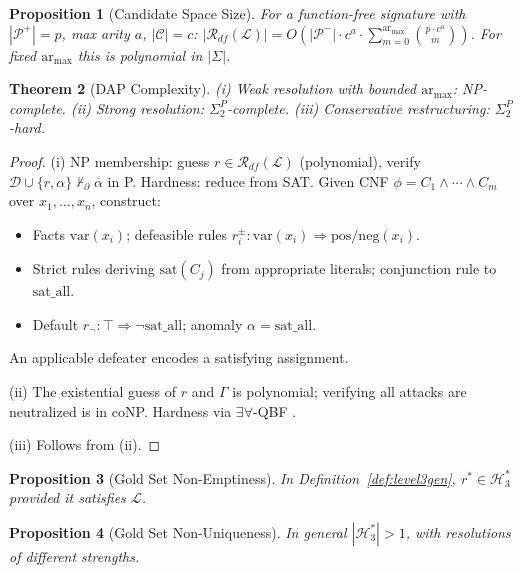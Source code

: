 \documentclass{article}
\newtheorem{theorem}{Theorem}[section]
\newtheorem{proposition}[theorem]{Proposition}
\theoremstyle{definition}
\newcommand{\D}{\mathcal{D}}
\newcommand{\Rgold}{\mathcal{H}^{*}_3}
\newcommand{\La}{\mathcal{L}}
\newcommand{\Rdfspace}{\mathcal{R}_{df}}
\newcommand{\pPartial}{\vdash_{\partial}}
\newcommand{\defto}{\Rightarrow}
\newcommand{\comp}[1]{\overline{#1}}
\begin{document}
\begin{proposition}[Candidate Space Size]\label{prop:candsize}
For a function-free signature with $|\mathcal{P}^+| = p$, max arity $a$, $|\mathcal{C}| = c$:
$|\Rdfspace(\La)| = O(|\mathcal{P}^-| \cdot c^a \cdot \sum_{m=0}^{\mathrm{ar}_{\max}} \binom{p \cdot c^a}{m})$.
For fixed $\mathrm{ar}_{\max}$ this is polynomial in $|\Sigma|$.
\end{proposition}

\begin{theorem}[DAP Complexity]\label{thm:dapcomplex}
(i) Weak resolution with bounded $\mathrm{ar}_{\max}$: NP-complete. (ii) Strong resolution: $\Sigma_2^P$-complete. (iii) Conservative restructuring: $\Sigma_2^P$-hard.
\end{theorem}

\begin{proof}
(i) NP membership: guess $r \in \Rdfspace(\La)$ (polynomial), verify $\D \cup \{r, \alpha\} \not\pPartial \comp{\alpha}$ in P. Hardness: reduce from SAT. Given CNF $\phi = C_1 \wedge \cdots \wedge C_m$ over $x_1, \ldots, x_n$, construct:
\begin{itemize}[nosep]
    \item Facts $\mathrm{var}(x_i)$; defeasible rules $r_i^\pm\colon \mathrm{var}(x_i) \defto \mathrm{pos/neg}(x_i)$.
    \item Strict rules deriving $\mathrm{sat}(C_j)$ from appropriate literals; conjunction rule to $\mathrm{sat\_all}$.
    \item Default $r_\neg\colon \top \defto \neg\mathrm{sat\_all}$; anomaly $\alpha = \mathrm{sat\_all}$.
\end{itemize}
An applicable defeater encodes a satisfying assignment.

(ii) The existential guess of $r$ and $\Gamma$ is polynomial; verifying all attacks are neutralized is in coNP. Hardness via $\exists\forall$-QBF \cite{eiter1995complexity}.

(iii) Follows from (ii).
\end{proof}

\begin{proposition}[Gold Set Non-Emptiness]\label{prop:goldnonempty}
In Definition~\ref{def:level3gen}, $r^* \in \Rgold$ provided it satisfies $\La$.
\end{proposition}

\begin{proposition}[Gold Set Non-Uniqueness]\label{prop:goldnonuniq}
In general $|\Rgold| > 1$, with resolutions of different strengths.
\end{proposition}
\end{document}
